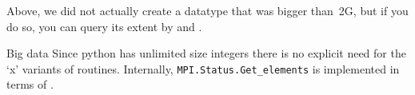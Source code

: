 Above, we did not actually create a datatype that was bigger than~2G,
but if you do so, you can query its extent by
and
.

\begin{pythonnote}{Big data}
  Since python has unlimited size integers there is
  no explicit need for the `x' variants of routines.
  Internally, \lstinline+MPI.Status.Get_elements+ is implemented
  in terms of .
\end{pythonnote}


